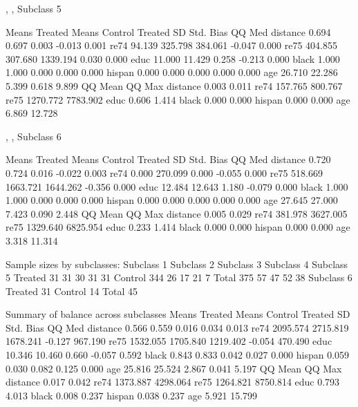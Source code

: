\documentclass[oneside,letterpaper,titlepage]{article}
\begin{document}
\begin{Schunk}
\begin{Soutput}
, , Subclass 5

         Means Treated Means Control Treated SD Std. Bias    QQ Med
distance         0.694         0.697      0.003    -0.013     0.001
re74            94.139       325.798    384.061    -0.047     0.000
re75           404.855       307.680   1339.194     0.030     0.000
educ            11.000        11.429      0.258    -0.213     0.000
black            1.000         1.000      0.000     0.000     0.000
hispan           0.000         0.000      0.000     0.000     0.000
age             26.710        22.286      5.399     0.618     9.899
           QQ Mean    QQ Max
distance     0.003     0.011
re74       157.765   800.767
re75      1270.772  7783.902
educ         0.606     1.414
black        0.000     0.000
hispan       0.000     0.000
age          6.869    12.728

, , Subclass 6

         Means Treated Means Control Treated SD Std. Bias    QQ Med
distance         0.720         0.724      0.016    -0.022     0.003
re74             0.000       270.099      0.000    -0.055     0.000
re75           518.669      1663.721   1644.262    -0.356     0.000
educ            12.484        12.643      1.180    -0.079     0.000
black            1.000         1.000      0.000     0.000     0.000
hispan           0.000         0.000      0.000     0.000     0.000
age             27.645        27.000      7.423     0.090     2.448
           QQ Mean    QQ Max
distance     0.005     0.029
re74       381.978  3627.005
re75      1329.640  6825.954
educ         0.233     1.414
black        0.000     0.000
hispan       0.000     0.000
age          3.318    11.314


Sample sizes by subclasses:
        Subclass 1 Subclass 2 Subclass 3 Subclass 4 Subclass 5
Treated         31         31         30         31         31
Control        344         26         17         21          7
Total          375         57         47         52         38
        Subclass 6
Treated         31
Control         14
Total           45

Summary of balance across subclasses
         Means Treated Means Control Treated SD Std. Bias  QQ Med
distance         0.566         0.559      0.016     0.034   0.013
re74          2095.574      2715.819   1678.241    -0.127 967.190
re75          1532.055      1705.840   1219.402    -0.054 470.490
educ            10.346        10.460      0.660    -0.057   0.592
black            0.843         0.833      0.042     0.027   0.000
hispan           0.059         0.030      0.082     0.125   0.000
age             25.816        25.524      2.867     0.041   5.197
          QQ Mean   QQ Max
distance    0.017    0.042
re74     1373.887 4298.064
re75     1264.821 8750.814
educ        0.793    4.013
black       0.008    0.237
hispan      0.038    0.237
age         5.921   15.799


\end{Soutput}
\end{Schunk}
\end{document}
